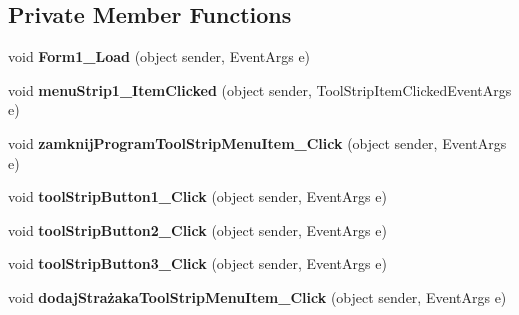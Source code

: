 \subsection*{Private Member Functions}
\begin{DoxyCompactItemize}
\item 
\mbox{\label{class_statystyki___o_s_p_1_1_menu_glowne_a9e2f088947412701a6adfad9bc5ac845}} 
void {\bfseries Form1\+\_\+\+Load} (object sender, Event\+Args e)
\item 
\mbox{\label{class_statystyki___o_s_p_1_1_menu_glowne_a99e00a7f5f1bf595f7c61defd1a70166}} 
void {\bfseries menu\+Strip1\+\_\+\+Item\+Clicked} (object sender, Tool\+Strip\+Item\+Clicked\+Event\+Args e)
\item 
\mbox{\label{class_statystyki___o_s_p_1_1_menu_glowne_a4b3e5c6d824c8405e2afb8b7454c152b}} 
void {\bfseries zamknij\+Program\+Tool\+Strip\+Menu\+Item\+\_\+\+Click} (object sender, Event\+Args e)
\item 
\mbox{\label{class_statystyki___o_s_p_1_1_menu_glowne_a1e4ed1fa381741da8c69123f7c8518d4}} 
void {\bfseries tool\+Strip\+Button1\+\_\+\+Click} (object sender, Event\+Args e)
\item 
\mbox{\label{class_statystyki___o_s_p_1_1_menu_glowne_a6e54b51c6e5a6aa103d02547091a5720}} 
void {\bfseries tool\+Strip\+Button2\+\_\+\+Click} (object sender, Event\+Args e)
\item 
\mbox{\label{class_statystyki___o_s_p_1_1_menu_glowne_ab533b79ae1568c75a4f27d5df16ae27a}} 
void {\bfseries tool\+Strip\+Button3\+\_\+\+Click} (object sender, Event\+Args e)
\item 
\mbox{\label{class_statystyki___o_s_p_1_1_menu_glowne_a7bc088ce08d14b53c51f48a2bd492c34}} 
void {\bfseries dodaj\+Strażaka\+Tool\+Strip\+Menu\+Item\+\_\+\+Click} (object sender, Event\+Args e)
\item 
\mbox{\label{class_statystyki___o_s_p_1_1_menu_glowne_a9ec7d83e8e47d9eb42f874329aa9551c}} 

\end{DoxyCompactItemize}

